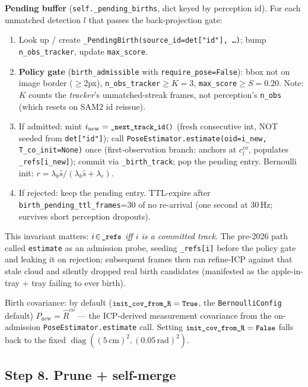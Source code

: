 \documentclass[11pt]{article}
\newcommand{\code}[1]{\texttt{\small #1}}
\begin{document}
\textbf{Pending buffer} (\code{self.\_pending\_births}, dict keyed by
perception id). For each unmatched detection $l$ that passes the
back-projection gate:
\begin{enumerate}[leftmargin=1.5em,itemsep=0pt,topsep=2pt]
\item Look up / create \code{\_PendingBirth(source\_id=det["id"], \dots)}; bump
   \code{n\_obs\_tracker}, update \code{max\_score}.
\item \textbf{Policy gate} (\code{birth\_admissible} with \code{require\_pose=False}):
   bbox not on image border ($\ge$2px), \code{n\_obs\_tracker}$\ge K\!=\!3$,
   \code{max\_score}$\ge S\!=\!0.20$. Note: $K$ counts the
   \emph{tracker}'s unmatched-streak frames, not perception's
   \code{n\_obs} (which resets on SAM2 id reissue).
\item If admitted: mint $i_{\text{new}}=\code{\_next\_track\_id()}$ (fresh
   consecutive int, NOT seeded from \code{det["id"]}); call
   \code{PoseEstimator.estimate(oid=i\_new, T\_co\_init=None)} once
   (first-observation branch: anchors at $c^{co}_l$, populates
   \code{\_refs[i\_new]}); commit via \code{\_birth\_track}; pop the
   pending entry. Bernoulli init: $r=\lambda_b\hat s/(\lambda_b\hat s+\lambda_c)$.
\item If rejected: keep the pending entry. TTL-expire after
   \code{birth\_pending\_ttl\_frames}=30 of no re-arrival (one second
   at 30\,Hz; survives short perception dropouts).
\end{enumerate}

This invariant matters: \emph{$i\!\in\!\code{\_refs}$ iff $i$ is a
committed track}. The pre-2026 path called \code{estimate} as an
admission probe, seeding \code{\_refs[i]} before the policy gate and
leaking it on rejection; subsequent frames then ran refine-ICP against
that stale cloud and silently dropped real birth candidates (manifested
as the apple-in-tray + tray failing to ever birth).

Birth covariance: by default ($\code{init\_cov\_from\_R}=\code{True}$,
the \code{BernoulliConfig} default) $P_{\text{new}}=\hat R^{co}$ — the
ICP-derived measurement covariance from the on-admission
\code{PoseEstimator.estimate} call. Setting
$\code{init\_cov\_from\_R}=\code{False}$ falls back to the fixed
$\operatorname{diag}((5\,\text{cm})^2,(0.05\,\text{rad})^2)$.

\subsection{Step 8. Prune + self-merge}
\end{document}

